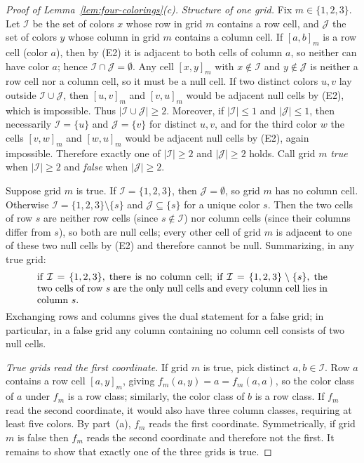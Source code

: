 \begin{proof}[Proof of Lemma~\ref{lem:four-colorings}\textup{(c)}]
\emph{Structure of one grid.} Fix $m\in\{1,2,3\}$. Let $\mathcal I$ be the set of colors $x$ whose row in grid $m$ contains a row cell, and $\mathcal J$ the set of colors $y$ whose column in grid $m$ contains a column cell. If $[a,b]_m$ is a row cell (color $a$), then by (E2) it is adjacent to both cells of column $a$, so neither can have color $a$; hence $\mathcal I\cap\mathcal J=\emptyset$. Any cell $[x,y]_m$ with $x\notin\mathcal I$ and $y\notin\mathcal J$ is neither a row cell nor a column cell, so it must be a null cell. If two distinct colors $u,v$ lay outside $\mathcal I\cup\mathcal J$, then $[u,v]_m$ and $[v,u]_m$ would be adjacent null cells by (E2), which is impossible. Thus $|\mathcal I\cup\mathcal J|\ge2$. Moreover, if $|\mathcal I|\le1$ and $|\mathcal J|\le1$, then necessarily $\mathcal I=\{u\}$ and $\mathcal J=\{v\}$ for distinct $u,v$, and for the third color $w$ the cells $[v,w]_m$ and $[w,u]_m$ would be adjacent null cells by (E2), again impossible. Therefore exactly one of $|\mathcal I|\ge2$ and $|\mathcal J|\ge2$ holds. Call grid $m$ \emph{true} when $|\mathcal I|\ge2$ and \emph{false} when $|\mathcal J|\ge2$.

Suppose grid $m$ is true. If $\mathcal I=\{1,2,3\}$, then $\mathcal J=\emptyset$, so grid $m$ has no column cell. Otherwise $\mathcal I=\{1,2,3\}\setminus\{s\}$ and $\mathcal J\subseteq\{s\}$ for a unique color $s$. Then the two cells of row $s$ are neither row cells (since $s\notin\mathcal I$) nor column cells (since their columns differ from $s$), so both are null cells; every other cell of grid $m$ is adjacent to one of these two null cells by (E2) and therefore cannot be null. Summarizing, in any true grid:
\begin{equation}\label{eq:true-grid}
\begin{minipage}{0.86\textwidth}
if $\mathcal I=\{1,2,3\}$, there is no column cell; if $\mathcal I=\{1,2,3\}\setminus\{s\}$, the two cells of row $s$ are the only null cells and every column cell lies in column $s$.
\end{minipage}
\end{equation}
Exchanging rows and columns gives the dual statement for a false grid; in particular, in a false grid any column containing no column cell consists of two null cells.

\emph{True grids read the first coordinate.} If grid $m$ is true, pick distinct $a,b\in\mathcal I$. Row $a$ contains a row cell $[a,y]_m$, giving $f_m(a,y)=a=f_m(a,a)$, so the color class of $a$ under $f_m$ is a row class; similarly, the color class of $b$ is a row class. If $f_m$ read the second coordinate, it would also have three column classes, requiring at least five colors. By part~(a), $f_m$ reads the first coordinate. Symmetrically, if grid $m$ is false then $f_m$ reads the second coordinate and therefore not the first. It remains to show that exactly one of the three grids is true.


\end{proof}
